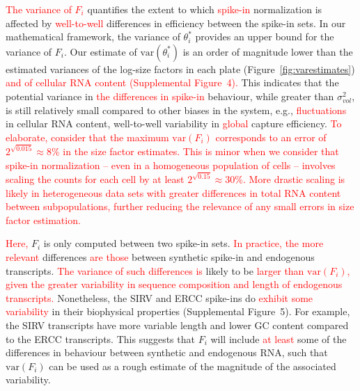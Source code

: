 \documentclass{article}
\newcommand{\suppfigcell}{4}
\newcommand{\suppfigbiophys}{5}
\newcommand{\revised}[1]{\textcolor{red}{#1}}
\newcommand\variance{\mbox{var}}
\begin{document}
\revised{The variance of $F_i$} quantifies the extent to which \revised{spike-in} normalization is affected by \revised{well-to-well} differences in efficiency between the spike-in sets.
In our mathematical framework, the variance of $\theta^*_i$ provides an upper bound for the variance of $F_i$.
Our estimate of $\variance(\theta^*_i)$ is an order of magnitude lower than the estimated variances of the log-size factors in each plate (Figure~\ref{fig:varestimates}) \revised{and of cellular RNA content (Supplemental Figure~\suppfigcell{}).}
This indicates that the potential variance in \revised{the differences in spike-in} behaviour, while greater than $\sigma^2_{vol}$, is still relatively small compared to other biases in the system, e.g., \revised{fluctuations} in cellular RNA content, well-to-well variability in \revised{global} capture efficiency.
\revised{To elaborate, consider that the maximum $\variance(F_i)$ corresponds to an error of $2^{\sqrt{0.015}} \approx 8$\% in the size factor estimates.
This is minor when we consider that spike-in normalization -- even in a homogeneous population of cells -- involves scaling the counts for each cell by at least $2^{\sqrt{0.15}} \approx 30$\%.
More drastic scaling is likely in heterogeneous data sets with greater differences in total RNA content between subpopulations, further reducing the relevance of any small errors in size factor estimation.}

\revised{Here,} $F_i$ is only computed between two spike-in sets.
\revised{In practice, the more relevant} differences \revised{are those} between synthetic spike-in and endogenous transcripts.
\revised{The variance of such differences is} likely to be \revised{larger than $\variance(F_i)$, given the greater variability in sequence composition and length of endogenous transcripts.}
Nonetheless, the SIRV and ERCC spike-ins do \revised{exhibit some variability} in their biophysical properties (Supplemental Figure~\suppfigbiophys{}).
For example, the SIRV transcripts have more variable length and lower GC content compared to the ERCC transcripts.
This suggests that $F_i$ will include \revised{at least} some of the differences in behaviour between synthetic and endogenous RNA, such that $\variance(F_i)$ can be used as a rough estimate of the magnitude of the associated variability.
\end{document}
